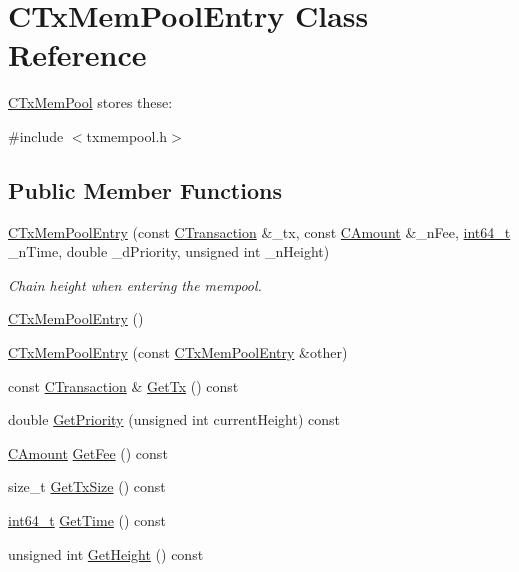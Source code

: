 \hypertarget{class_c_tx_mem_pool_entry}{}\section{C\+Tx\+Mem\+Pool\+Entry Class Reference}
\label{class_c_tx_mem_pool_entry}


\hyperlink{class_c_tx_mem_pool}{C\+Tx\+Mem\+Pool} stores these\+:  




{\ttfamily \#include $<$txmempool.\+h$>$}

\subsection*{Public Member Functions}
\begin{DoxyCompactItemize}
\item 
\hyperlink{class_c_tx_mem_pool_entry_a2ceb48d4c37f0308e97f57e237b50a67}{C\+Tx\+Mem\+Pool\+Entry} (const \hyperlink{class_c_transaction}{C\+Transaction} \&\+\_\+tx, const \hyperlink{amount_8h_a4eaf3a5239714d8c45b851527f7cb564}{C\+Amount} \&\+\_\+n\+Fee, \hyperlink{stdint_8h_adec1df1b8b51cb32b77e5b86fff46471}{int64\+\_\+t} \+\_\+n\+Time, double \+\_\+d\+Priority, unsigned int \+\_\+n\+Height)
\begin{DoxyCompactList}\small\item\em Chain height when entering the mempool. \end{DoxyCompactList}\item 
\hyperlink{class_c_tx_mem_pool_entry_a4a22f1c696136f99f5c296c90cf0406a}{C\+Tx\+Mem\+Pool\+Entry} ()
\item 
\hyperlink{class_c_tx_mem_pool_entry_ad62eaba6adc7ec36487ae690b5b93148}{C\+Tx\+Mem\+Pool\+Entry} (const \hyperlink{class_c_tx_mem_pool_entry}{C\+Tx\+Mem\+Pool\+Entry} \&other)
\item 
const \hyperlink{class_c_transaction}{C\+Transaction} \& \hyperlink{class_c_tx_mem_pool_entry_a59f51f38161c191dae2614c53ed40fb2}{Get\+Tx} () const 
\item 
double \hyperlink{class_c_tx_mem_pool_entry_aa419a2eb4c9f1097e6e692bb8e60ebde}{Get\+Priority} (unsigned int current\+Height) const 
\item 
\hyperlink{amount_8h_a4eaf3a5239714d8c45b851527f7cb564}{C\+Amount} \hyperlink{class_c_tx_mem_pool_entry_a313b0505c1df8796713e807508ebe456}{Get\+Fee} () const 
\item 
size\+\_\+t \hyperlink{class_c_tx_mem_pool_entry_a500fcb2039ceb24798d8ddb7d548b7b5}{Get\+Tx\+Size} () const 
\item 
\hyperlink{stdint_8h_adec1df1b8b51cb32b77e5b86fff46471}{int64\+\_\+t} \hyperlink{class_c_tx_mem_pool_entry_a249b1f68b5b06bf8ec8fcbb5bef61090}{Get\+Time} () const 
\item 
unsigned int \hyperlink{class_c_tx_mem_pool_entry_ac519a06da6ba8f9358d4301c5cac4ac9}{Get\+Height} () const 
\end{DoxyCompactItemize}


